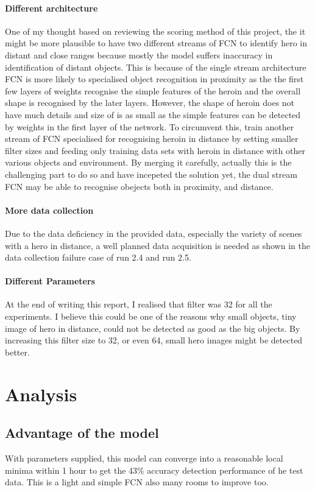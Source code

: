 \documentclass[paper=a4, fontsize=11pt]{scrartcl} %
\numberwithin{equation}{section} %
\numberwithin{figure}{section} %
\numberwithin{table}{section} %
\begin{document}
\paragraph{Different architecture}
One of my thought based on reviewing the scoring method of this project, the it might be more plausible to have two different streams of FCN to identify hero in distant and close ranges because mostly the model suffers inaccuracy in identification of distant objects. This is because of the single stream architecture FCN is more likely to specialised object recognition in proximity as the the first few layers of weights recognise the simple features of the heroin and the overall shape is recognised by the later layers. However, the shape of heroin does not have much details and size of is as small as the simple features can be detected by weights in the first layer of the network. To circumvent this, train another stream of FCN specialised for recognising heroin in distance by setting smaller filter sizes and feeding only training data sets with heroin in distance with other various objects and environment. By merging it carefully, actually this is the challenging part to do so and have incepeted the solution yet, the dual stream FCN may be able to recognise obejects both in proximity, and distance.
\paragraph{More data collection}
Due to the data deficiency in the provided data, especially the variety of scenes with a hero in distance, a well planned data acquisition is needed as shown in the data collection failure case of run 2.4 and run 2.5. 
\paragraph{Different Parameters}
At the end of writing this report, I realised that filter was 32 for all the experiments. I believe this could be one of the reasons why small objects, tiny image of hero in distance, could not be detected as good as the big objects. By increasing this filter size to 32, or even 64, small hero images might be detected better.
\pagebreak
\section{Analysis}
\subsection{Advantage of the model}
With parameters supplied, this model can converge into a reasonable local minima within 1 hour to get the 43\% accuracy detection performance of he test data. This is a light and simple FCN also many rooms to improve too.
\end{document}

